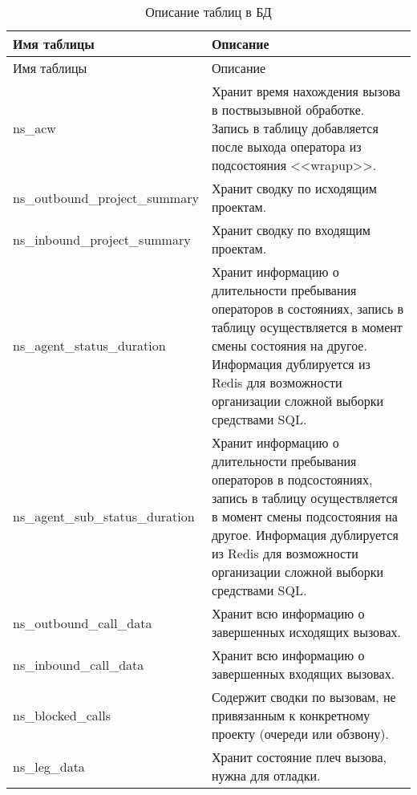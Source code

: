 \begin{small}
    \begin{longtable}{|p{}|p{}|}
        \caption{Описание таблиц в БД}
        \label{tab:db:summary}
        \\ \hline
        Имя таблицы & Описание \\
        \hline \endfirsthead
        \hline
        Имя таблицы & Описание \\
        \hline
        \endhead
        \hline \endlastfoot
        ns\_acw & Хранит время нахождения вызова в поствызывной обработке.
        Запись в таблицу добавляется после выхода оператора из подсостояния <<wrapup>>. \\
        \hline
        ns\_outbound\_project\_summary & Хранит сводку по исходящим проектам. \\
        \hline
        ns\_inbound\_project\_summary & Хранит сводку по входящим проектам. \\
        \hline
        ns\_agent\_status\_duration &
        Хранит информацию о длительности пребывания операторов в состояниях,
        запись в таблицу осуществляется в момент смены состояния на другое.
        Информация дублируется из Redis для возможности организации сложной выборки средствами SQL\@. \\
        \hline
        ns\_agent\_sub\_status\_duration &
        Хранит информацию о длительности пребывания операторов в подсостояниях,
        запись в таблицу осуществляется в момент смены подсостояния на другое.
        Информация дублируется из Redis для возможности организации сложной выборки средствами SQL\@.  \\
        \hline
        ns\_outbound\_call\_data &
        Хранит всю информацию о завершенных исходящих вызовах. \\
        \hline
        ns\_inbound\_call\_data &
        Хранит всю информацию о завершенных входящих вызовах. \\
        \hline
        ns\_blocked\_calls &
        Содержит сводки по вызовам, не привязанным к конкретному проекту (очереди или обзвону). \\
        \hline
        ns\_leg\_data &
        Хранит состояние плеч вызова, нужна для отладки. \\
    \end{longtable}
\end{small}

